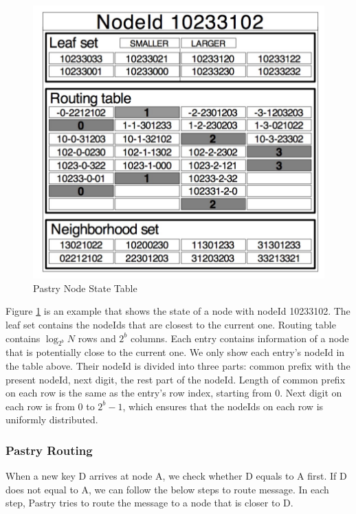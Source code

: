 \documentclass[11pt,a4paper]{article}
\begin{document}
    \begin{figure}[h]
        \centering
        \includegraphics[scale=0.3]{image/pastry_node_state.jpg}
        \caption{Pastry Node State Table}
        \label{pastrynst}
    \end{figure}
    
    Figure \ref{pastrynst} is an example that shows the state of a node with nodeId 10233102. The leaf set contains the nodeIds that are closest to the current one. Routing table contains \(\log_{2^b} N \) rows and \(2^{b}\) columns. Each entry contains information of a node that is potentially close to the current one. We only show each entry’s nodeId in the table above. Their nodeId is divided into three parts: common prefix with the present nodeId, next digit, the rest part of the nodeId. Length of common prefix on each row is the same as the entry’s row index, starting from 0. Next digit on each row is from 0 to \(2^{b}-1\), which ensures that the nodeIds on each row is uniformly distributed.
    
    \subsubsection{Pastry Routing}
    When a new key D arrives at node A, we check whether D equals to A first. If D does not equal to A, we can follow the below steps to route message. In each step, Pastry tries to route the message to a node that is closer to D.
    
\end{document}
